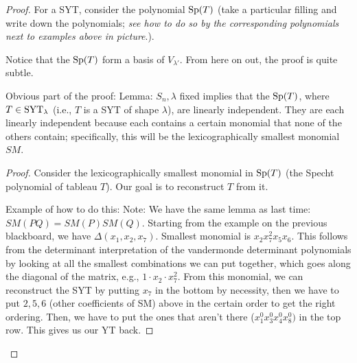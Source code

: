 \documentclass[../notes.tex]{subfiles}
\begin{document}
\begin{itemize}
\begin{proof}
        For a SYT, consider the polynomial $\operatorname{Sp}(T)$ (take a particular filling and write down the polynomials; \emph{see how to do so by the corresponding polynomials next to examples above in picture}.).

        Notice that the $\operatorname{Sp}(T)$ form a basis of $V_{\lambda'}$. From here on out, the proof is quite subtle.

        Obvious part of the proof: Lemma: $S_n,\lambda$ fixed implies that the $\operatorname{Sp}(T)$, where $T\in\operatorname{SYT}_\lambda$ (i.e., $T$ is a SYT of shape $\lambda$), are linearly independent. They are each linearly independent because each contains a certain monomial that none of the others contain; specifically, this will be the lexicographically smallest monomial $SM$.
        \begin{proof}
            Consider the lexicographically smallest monomial in $\operatorname{Sp}(T)$ (the Specht polynomial of tableau $T$). Our goal is to reconstruct $T$ from it.

            Example of how to do this: Note: We have the same lemma as last time: $SM(PQ)=SM(P)SM(Q)$. Starting from the example on the previous blackboard, we have $\Delta(x_1,x_2,x_7)$. Smallest monomial is $x_2x_7^2x_5x_6$. This follows from the determinant interpretation of the vandermonde determinant polynomials by looking at all the smallest combinations we can put together, which goes along the diagonal of the matrix, e.g., $1\cdot x_2\cdot x_7^2$. From this monomial, we can reconstruct the SYT by putting $x_7$ in the bottom by necessity, then we have to put $2,5,6$ (other coefficients of SM) above in the certain order to get the right ordering. Then, we have to put the ones that aren't there ($x_1^0x_3^0x_4^0x_8^0)$ in the top row. This gives us our YT back.
            

\end{proof}
\end{proof}
\end{itemize}
\end{document}
